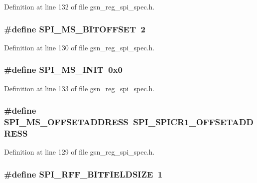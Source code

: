Definition at line 132 of file gsn\_\-reg\_\-spi\_\-spec.h.

\hypertarget{a00573_a00fa809aec9920ed92a3abb4a0a8361a}{
\subsubsection[{SPI\_\-MS\_\-BITOFFSET}]{\setlength{\rightskip}{0pt plus 5cm}\#define SPI\_\-MS\_\-BITOFFSET~2}}
\label{a00573_a00fa809aec9920ed92a3abb4a0a8361a}


Definition at line 130 of file gsn\_\-reg\_\-spi\_\-spec.h.

\hypertarget{a00573_a56ba0df6627cd38d8edfdca3de81495c}{
\subsubsection[{SPI\_\-MS\_\-INIT}]{\setlength{\rightskip}{0pt plus 5cm}\#define SPI\_\-MS\_\-INIT~0x0}}
\label{a00573_a56ba0df6627cd38d8edfdca3de81495c}


Definition at line 133 of file gsn\_\-reg\_\-spi\_\-spec.h.

\hypertarget{a00573_a159e320823468b3c2978af9095cd1aaf}{
\subsubsection[{SPI\_\-MS\_\-OFFSETADDRESS}]{\setlength{\rightskip}{0pt plus 5cm}\#define SPI\_\-MS\_\-OFFSETADDRESS~SPI\_\-SPICR1\_\-OFFSETADDRESS}}
\label{a00573_a159e320823468b3c2978af9095cd1aaf}


Definition at line 129 of file gsn\_\-reg\_\-spi\_\-spec.h.

\hypertarget{a00573_a29d2697bd6417ad237880dc5e66804b1}{
\subsubsection[{SPI\_\-RFF\_\-BITFIELDSIZE}]{\setlength{\rightskip}{0pt plus 5cm}\#define SPI\_\-RFF\_\-BITFIELDSIZE~1}}
\label{a00573_a29d2697bd6417ad237880dc5e66804b1}



